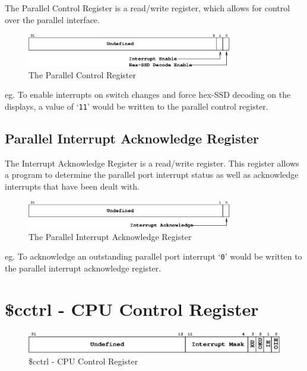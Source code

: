 \documentclass[a4paper,10pt]{article}
\begin{document}
The Parallel Control Register is a read/write register, which allows
for control over the parallel interface.

\begin{figure}[h]
\begin{center}
\includegraphics[width=0.8\textwidth]{parallel_cr.eps}
\caption{The Parallel Control Register}
\label{parallel_cr_pic}
\end{center}
\end{figure}

eg. To enable interrupts on switch changes and force hex-SSD decoding
on the displays, a value of `\texttt{11}' would be written to
the parallel control register.

\subsection{Parallel Interrupt Acknowledge Register}

The Interrupt Acknowledge Register is a read/write register. This
register allows a program to determine the parallel port interrupt
status as well as acknowledge interrupts that have been dealt with.

\begin{figure}[h]
\begin{center}
\includegraphics[width=0.8\textwidth]{parallel_iack.eps}
\caption{The Parallel Interrupt Acknowledge Register}
\label{parallel_iack_pic}
\end{center}
\end{figure}

eg. To acknowledge an outstanding parallel port interrupt `\texttt{0}'
would be written to the parallel interrupt acknowledge register.

\newpage
\section{\$cctrl - CPU Control Register}
\label{appen:cctrl}
\begin{figure}[h]
\begin{center}
\includegraphics[width=\textwidth]{cctrl.eps}
\caption{\$cctrl - CPU Control Register}
\label{cctrl_pic}
\end{center}
\end{figure}
\end{document}

